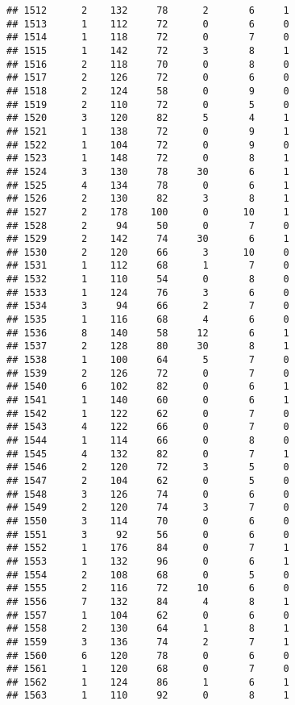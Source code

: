 \documentclass[
]{article}
\begin{document}
\begin{verbatim}
## 1512      2    132     78      2       6     1
## 1513      1    112     72      0       6     0
## 1514      1    118     72      0       7     0
## 1515      1    142     72      3       8     1
## 1516      2    118     70      0       8     0
## 1517      2    126     72      0       6     0
## 1518      2    124     58      0       9     0
## 1519      2    110     72      0       5     0
## 1520      3    120     82      5       4     1
## 1521      1    138     72      0       9     1
## 1522      1    104     72      0       9     0
## 1523      1    148     72      0       8     1
## 1524      3    130     78     30       6     1
## 1525      4    134     78      0       6     1
## 1526      2    130     82      3       8     1
## 1527      2    178    100      0      10     1
## 1528      2     94     50      0       7     0
## 1529      2    142     74     30       6     1
## 1530      2    120     66      3      10     0
## 1531      1    112     68      1       7     0
## 1532      1    110     54      0       8     0
## 1533      1    124     76      3       6     0
## 1534      3     94     66      2       7     0
## 1535      1    116     68      4       6     0
## 1536      8    140     58     12       6     1
## 1537      2    128     80     30       8     1
## 1538      1    100     64      5       7     0
## 1539      2    126     72      0       7     0
## 1540      6    102     82      0       6     1
## 1541      1    140     60      0       6     1
## 1542      1    122     62      0       7     0
## 1543      4    122     66      0       7     0
## 1544      1    114     66      0       8     0
## 1545      4    132     82      0       7     1
## 1546      2    120     72      3       5     0
## 1547      2    104     62      0       5     0
## 1548      3    126     74      0       6     0
## 1549      2    120     74      3       7     0
## 1550      3    114     70      0       6     0
## 1551      3     92     56      0       6     0
## 1552      1    176     84      0       7     1
## 1553      1    132     96      0       6     1
## 1554      2    108     68      0       5     0
## 1555      2    116     72     10       6     0
## 1556      7    132     84      4       8     1
## 1557      1    104     62      0       6     0
## 1558      2    130     64      1       8     1
## 1559      3    136     74      2       7     1
## 1560      6    120     78      0       6     0
## 1561      1    120     68      0       7     0
## 1562      1    124     86      1       6     1
## 1563      1    110     92      0       8     1

\end{verbatim}
\end{document}
